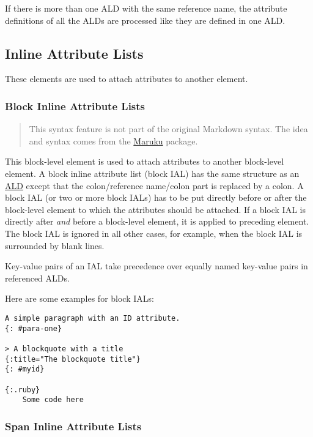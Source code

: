 \documentclass[a4paper]{article}
\begin{document}
If there is more than one ALD with the same reference name, the
attribute definitions of all the ALDs are processed like they are
defined in one ALD.

\hypertarget{inline-attribute-lists}{\subsection{Inline Attribute
Lists}\label{inline-attribute-lists}}

These elements are used to attach attributes to another element.

\hypertarget{block-ials}{\subsubsection{Block Inline Attribute
Lists}\label{block-ials}}

\begin{quote}
This syntax feature is not part of the original Markdown syntax. The
idea and syntax comes from the
\href{http://maruku.rubyforge.org}{Maruku} package.
\end{quote}

This block-level element is used to attach attributes to another
block-level element. A block inline attribute list (block IAL) has the
same structure as an \protect\hyperlink{attribute-list-definitions}{ALD}
except that the colon/reference name/colon part is replaced by a colon.
A block IAL (or two or more block IALs) has to be put directly before or
after the block-level element to which the attributes should be
attached. If a block IAL is directly after \emph{and} before a
block-level element, it is applied to preceding element. The block IAL
is ignored in all other cases, for example, when the block IAL is
surrounded by blank lines.

Key-value pairs of an IAL take precedence over equally named key-value
pairs in referenced ALDs.

Here are some examples for block IALs:

\begin{verbatim}
A simple paragraph with an ID attribute.
{: #para-one}

> A blockquote with a title
{:title="The blockquote title"}
{: #myid}

{:.ruby}
    Some code here
\end{verbatim}

\hypertarget{span-ials}{\subsubsection{Span Inline Attribute
Lists}\label{span-ials}}
\end{document}
